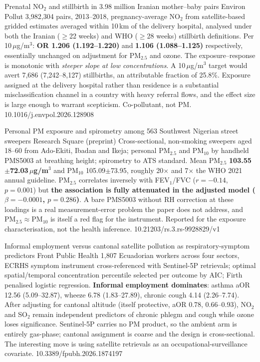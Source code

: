 \documentclass[10pt]{article}
\begin{document}
\clearpage


{Prenatal NO$_2$ and stillbirth in 3.98 million Iranian mother--baby pairs}
{Environ Pollut}
{3{,}982{,}304 pairs, 2013--2018, pregnancy-average NO$_2$ from satellite-based gridded
estimates averaged within 10\,km of the delivery hospital, analysed under both the Iranian
($\geq$22 weeks) and WHO ($\geq$28 weeks) stillbirth definitions. Per 10\,$\mu$g/m$^3$:
\textbf{OR 1.206 (1.192--1.220)} and \textbf{1.106 (1.088--1.125)} respectively,
essentially unchanged on adjustment for PM$_{2.5}$ and ozone. The exposure--response is
monotonic with \emph{steeper slope at low concentrations}. A 10\,$\mu$g/m$^3$ target would
avert 7{,}686 (7{,}242--8{,}127) stillbirths, an attributable fraction of 25.8\%.
Exposure assigned at the delivery hospital rather than residence is a substantial
misclassification channel in a country with heavy referral flows, and the effect size is
large enough to warrant scepticism. Co-pollutant, not PM.}
{10.1016/j.envpol.2026.128908}


{Personal PM exposure and spirometry among 563 Southwest Nigerian street sweepers}
{Research Square (preprint)}
{Cross-sectional, non-smoking sweepers aged 18--60 from Ado-Ekiti, Ibadan and Ikeja;
personal PM$_{2.5}$ and PM$_{10}$ by handheld PMS5003 at breathing height; spirometry to
ATS standard. Mean PM$_{2.5}$ \textbf{103.55$\pm$72.03\,$\mu$g/m$^3$} and PM$_{10}$
105.09$\pm$73.95, roughly 20$\times$ and 7$\times$ the WHO 2021 annual guideline.
PM$_{2.5}$ correlates inversely with FEV$_1$/FVC ($r=-0.14$, $p=0.001$) but
\textbf{the association is fully attenuated in the adjusted model ($\beta=-0.0001$,
$p=0.286$)}. A bare PMS5003 without RH correction at these loadings is a real
measurement-error problem the paper does not address, and PM$_{2.5}\approx$PM$_{10}$ is
itself a red flag for the instrument. Reported for the exposure characterisation, not the
health inference.}
{10.21203/rs.3.rs-9928829/v1}

{Informal employment versus cantonal satellite pollution as respiratory-symptom predictors}
{Front Public Health}
{1{,}807 Ecuadorian workers across four sectors, ECRHS symptom instrument cross-referenced
with Sentinel-5P retrievals; optimal spatial/temporal concentration percentile selected
per outcome by AIC; Firth penalised logistic regression. \textbf{Informal employment
dominates}: asthma aOR 12.56 (5.09--32.87), wheeze 6.78 (1.83--27.89), chronic cough 4.14
(2.26--7.74). After adjusting for cantonal altitude (itself protective, aOR 0.78,
0.66--0.93), NO$_2$ and SO$_2$ remain independent predictors of chronic phlegm and cough
while ozone loses significance. Sentinel-5P carries no PM product, so the ambient arm is
entirely gas-phase; cantonal assignment is coarse and the design is cross-sectional. The
interesting move is using satellite retrievals as an occupational-surveillance covariate.}
{10.3389/fpubh.2026.1874197}
\end{document}
